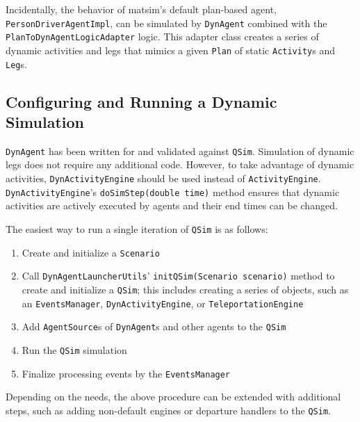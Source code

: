 Incidentally, the behavior of \gls{matsim}'s default plan-based agent, \lstinline$PersonDriverAgentImpl$, can be simulated by \lstinline$DynAgent$ combined with the \lstinline$PlanToDynAgentLogicAdapter$ logic. This adapter class creates a series of dynamic activities and legs that mimics a given \lstinline$Plan$ of static \lstinline$Activity$s and \lstinline$Leg$s.

\subsection{Configuring and Running a Dynamic Simulation}
\label{sec:config-dyn-sim}
\lstinline$DynAgent$ has been written for and validated against \lstinline$QSim$. Simulation of dynamic legs does not require any additional code. However, to take advantage of dynamic activities,  \lstinline$DynActivityEngine$ should be used instead of \lstinline$ActivityEngine$. \lstinline$DynActivityEngine$'s \lstinline$doSimStep(double time)$ method ensures that dynamic activities are actively executed by agents and their end times can be changed.

The easiest way to run a single iteration of \lstinline$QSim$ is as follows:
%
\begin{enumerate}
	\item Create and initialize a \lstinline$Scenario$

	\item Call \lstinline$DynAgentLauncherUtils$' \lstinline$initQSim(Scenario scenario)$ method to create and initialize a \lstinline$QSim$; this includes creating a series of objects, such as an \lstinline$EventsManager$, \lstinline$DynActivityEngine$, or \lstinline$TeleportationEngine$

	\item Add \lstinline$AgentSource$s of \lstinline$DynAgent$s and other agents to the \lstinline$QSim$
	
	\item Run the \lstinline$QSim$ simulation
	
	\item Finalize processing events by the \lstinline$EventsManager$
	
\end{enumerate}
%
Depending on the needs, the above procedure can be extended with additional steps, such as adding non-default engines or departure handlers to the \lstinline$QSim$.

